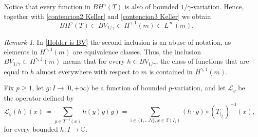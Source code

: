 \documentclass[12pt]{amsart}
\numberwithin{equation}{section} %
\numberwithin{figure}{section} %
\theoremstyle{plain}
\theoremstyle{definition}
\theoremstyle{remark}
\newtheorem{rema}[prop]{Remark}
\theoremstyle{citing}
\newcommand{\C}{\mathbb{C}}
\renewcommand{\=}{\coloneqq}
\begin{document}
 Notice that every function in $BH^{\gamma}(T)$ is also of bounded $1/\gamma$-variation. Hence, together with \eqref{contencion2 Keller} and  \eqref{contencion3 Keller} we obtain
\begin{equation}\label{Holder is BV}
    BH^{\gamma}(T)\subset BV_{1/\gamma}\subset H^{\gamma,1}(m)\subset L^{\infty}(m).
\end{equation}
\begin{rema}
    In \eqref{Holder is BV} the second inclusion is an abuse of notation, as elements in $H^{\gamma,1}(m)$ are equivalence classes. Thus, the inclusion $BV_{1/\gamma}\subset H^{\gamma,1}(m)$ means that for every $h \in BV_{1/\gamma}$, the class of functions that are equal to $h$ almost everywhere with respect to $m$ is contained in $H^{\gamma,1}(m)$.
\end{rema}

Fix $p\geq 1$, let $g\colon I\to [0,+\infty)$ be a function of bounded $p$-variation, and let $\mathscr{L}_g$ be the operator defined by
\begin{equation}\label{transfer operator 2}
    \mathscr{L}_g(h)(x)\= \sum_{y\in T^{-1}(x)} h(y)g(y) = \sum_{i\in\{1,\ldots N\}, x\in T(I_i)
    } (h\cdot g)\circ (T_{|_{I_i}})^{-1}(x),
\end{equation}
for every bounded $h:I\to \C$.
\end{document}
